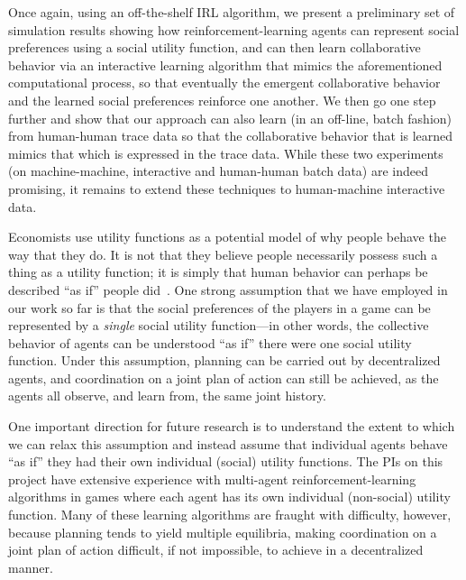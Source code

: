 Once again, using an off-the-shelf IRL algorithm, we present a
preliminary set of simulation results showing how
reinforcement-learning agents
can represent social preferences using a social utility function, and
can then learn collaborative behavior via an interactive learning
algorithm that mimics the aforementioned computational process, so
that eventually the emergent collaborative behavior and the learned
social preferences reinforce one another.  We then go one step further
and show that our approach can also learn (in an off-line, batch
fashion) from human-human trace data so that the collaborative
behavior that is learned mimics that which is expressed in the trace
data.  While these two experiments (on machine-machine, interactive
and human-human batch data) are indeed promising, it remains to extend
these techniques to human-machine interactive data.

Economists use utility functions as a potential model of why people
behave the way that they do.  It is not that they believe people
necessarily possess such a thing as a utility function; it is simply
that human behavior can perhaps be described ``as if'' people
did~\cite{Savage1954}.  One strong assumption that we have employed in
our work so far is that the social preferences of the players in a
game can be represented by a \emph{single\/} social utility
function---in other words, the collective behavior of agents can be
understood ``as if'' there were one social utility function.  Under
this assumption, planning can be carried out by decentralized agents,
and coordination on a joint plan of action can still be achieved, as
the agents all observe, and learn from, the same joint history.

One important direction for future research is to understand the
extent to which we can relax this assumption and instead assume that
individual agents behave ``as if'' they had their own individual
(social) utility functions.  The PIs on this project have extensive
experience with multi-agent reinforcement-learning algorithms in games
where each agent has its own individual (non-social) utility function.
Many of these learning algorithms are fraught with difficulty,
however, because planning tends to yield multiple equilibria, making
coordination on a joint plan of action difficult, if not impossible,
to achieve in a decentralized manner.

